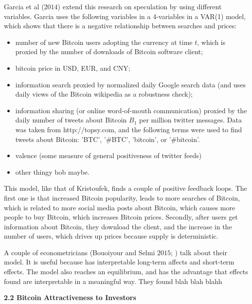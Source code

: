 \documentclass{article}[10 pt]
\newcommand{\vs}{\vspace{0.1in}}
\begin{document}
\vs

Garcia et al ($2014$) extend this research on speculation by using different
variables. Garcia uses the following variables in a 4-variables in a VAR(1)
model, which shows that there is a negative relationship between searches and
prices:

\begin{itemize}
    \item number of new Bitcoin users adopting the currency at time $t$,
        which is proxied by the number of downloads of Bitcoin software
        client;
    \item bitcoin price in USD, EUR, and CNY;
    \item information search proxied by normalized daily Google search data
        (and uses daily views of the Bitcoin wikipedia as a robustness
        check);
    \item information sharing (or online word-of-mouth communication)
        proxied by the daily number of tweets about Bitcoin $B_1$ per
        million twitter messages. Data was taken from http://topsy.com, and
        the following terms were used to find tweets about Bitcoin: 'BTC',
        '#BTC', 'bitcoin', or '#bitcoin'.
    \item valence (some measure of general positiveness of twitter feeds)
    \item other thingy bob maybe.
\end{itemize}


This model, like that of Kristoufek, finds a couple of positive
feedback loops. The first one is that increased Bitcoin popularity, leads to
more searches of Bitcoin, which is related to more social media posts about
Bitcoin, which causes more people to buy Bitcoin, which increases Bitcoin
prices. Secondly, after users get information about Bitcoin, they download
the client, and the increase in the number of users, which drives up prices because
supply is deterministic.

\vs

A couple of econometricians (Bouoiyour and Selmi $2015$; ) talk about their
model. It is useful because has interpretable long-term affects and
short-term effects. The model also reaches an equilibrium, and has the
advantage that effects found are interpretable in a meaningful way. They
found blah blah blahh

\vs

\textbf{2.2 Bitcoin Attractiveness to Investors}

\vs
\end{document}
